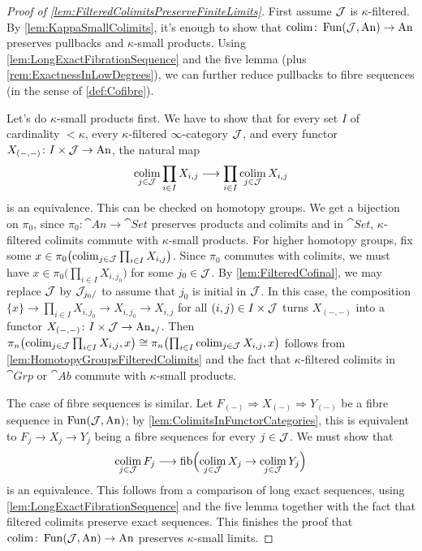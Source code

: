 \begin{proof}[Proof of \cref{lem:FilteredColimitsPreserveFiniteLimits}]
	First assume $\mathcal{J}$ is $\kappa$-filtered. By \cref{lem:KappaSmallColimits}, it's enough to show that $\operatorname*{colim}\colon\operatorname{Fun}(\mathcal{J},\mathrm{An})\rightarrow\mathrm{An}$ preserves pullbacks and $\kappa$-small products. Using \cref{lem:LongExactFibrationSequence} and the five lemma (plus \cref{rem:ExactnessInLowDegrees}), we can further reduce pullbacks to fibre sequences (in the sense of \cref{def:Cofibre}).
	
	Let's do $\kappa$-small products first. We have to show that for every set $I$ of cardinality $<\kappa$, every $\kappa$-filtered $\infty$-category $\mathcal{J}$, and every functor $X_{(-,-)}\colon I\times\mathcal{J}\rightarrow\mathrm{An}$, the natural map
	\begin{equation*}
		\operatorname*{colim}_{j\in\mathcal{J}}\prod_{i\in I}X_{i,j}\longrightarrow\prod_{i\in I}\operatorname*{colim}_{j\in\mathcal{J}}X_{i,j}
	\end{equation*}
	is an equivalence. This can be checked on homotopy groups. We get a bijection on $\pi_0$, since $\pi_0\colon\cat{An}\rightarrow\cat{Set}$ preserves products and colimits and in $\cat{Set}$, $\kappa$-filtered colimits commute with $\kappa$-small products. For higher homotopy groups, fix some $x\in \pi_0\bigl(\operatorname*{colim}_{j\in\mathcal{J}}\prod_{i\in I}X_{i,j}\bigr)$. Since $\pi_0$ commutes with colimits, we must have $x\in \pi_0\bigl(\prod_{i\in I}X_{i,j_0}\bigr)$ for some $j_0\in \mathcal{J}$. By \cref{lem:FilteredCofinal}, we may replace $\mathcal{J}$ by $\mathcal{J}_{j_0/}$ to assume that $j_0$ is initial in $\mathcal{J}$. In this case, the composition $\{x\}\rightarrow \prod_{i\in I}X_{i,j_0}\rightarrow X_{i,j_0}\rightarrow X_{i,j}$ for all $(i,j)\in I\times\mathcal{J}$ turns $X_{(-,-)}$ into a functor $X_{(-,-)}\colon I\times\mathcal{J}\rightarrow\mathrm{An}_{*/}$. Then $\pi_n\bigl(\operatorname*{colim}_{j\in\mathcal{J}}\prod_{i\in I}X_{i,j},x\bigr)\cong\pi_n\bigl(\prod_{i\in I}\operatorname*{colim}_{j\in\mathcal{J}}X_{i,j},x\bigr)$ follows from \cref{lem:HomotopyGroupsFilteredColimits} and the fact that $\kappa$-filtered colimits in $\cat{Grp}$ or $\cat{Ab}$ commute with $\kappa$-small products.%
	
	The case of fibre sequences is similar. Let $F_{(-)}\Rightarrow X_{(-)}\Rightarrow Y_{(-)}$ be a fibre sequence in $\operatorname{Fun}(\mathcal{J},\mathrm{An})$; by \cref{lem:ColimitsInFunctorCategories}, this is equivalent to $F_j\rightarrow X_j\rightarrow Y_j$ being a fibre sequences for every $j\in\mathcal{J}$. We must show that
	\begin{equation*}
		\operatorname*{colim}_{j\in \mathcal{J}}F_j\longrightarrow\operatorname{fib}\Bigl(\operatorname*{colim}_{j\in\mathcal{J}}X_j\rightarrow \operatorname*{colim}_{j\in\mathcal{J}}Y_j\Bigr)
	\end{equation*}
	is an equivalence. This follows from a comparison of long exact sequences, using \cref{lem:LongExactFibrationSequence} and the five lemma together with the fact that filtered colimits preserve exact sequences. This finishes the proof that $\operatorname*{colim}\colon \operatorname{Fun}(\mathcal{J},\mathrm{An})\rightarrow\mathrm{An}$ preserves $\kappa$-small limits.
	

\end{proof}
